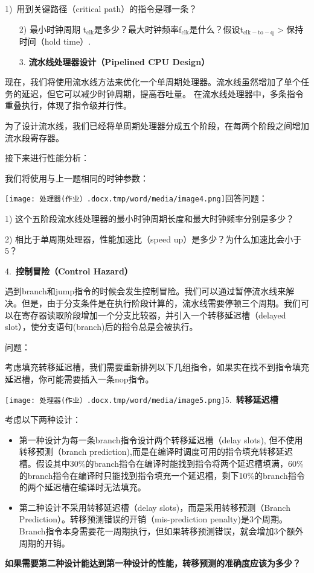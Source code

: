 \documentclass{scrbook}
\begin{document}
1)~\textcolor{color-1}{用到关键路径（critical path）的指令是哪一条？}\label{mark-1)}\begin{enumerate}[1)]
\setcounter{enumi}{1}

\item[2)] \textcolor{color-1}{最小时钟周期 t}$_{\mathrm{clk}}$\textcolor{color-1}{是多少？最大时钟频率f}$_{\mathrm{clk}}$\textcolor{color-1}{是什么？假设t}$_{\mathrm{clk-to-q}}$ \textcolor{color-1}{> 保持时间（hold time）.} 

\item[3.] \textbf{流水线处理器设计（Pipelined CPU Design）} 

\end{enumerate}
现在，我们将使用流水线方法来优化一个单周期处理器。流水线虽然增加了单个任务的延迟，但它可以减少时钟周期，提高吞吐量。 在流水线处理器中，多条指令重叠执行，体现了指令级并行性。

为了设计流水线，我们已经将单周期处理器分成五个阶段，在每两个阶段之间增加流水段寄存器。

接下来进行性能分析：

我们将使用与上一题相同的时钟参数：

\texttt{[image: 处理器(作业）.docx.tmp/word/media/image4.png]}\textcolor{color-1}{回答问题：}

1)	\textcolor{color-1}{这个五阶段流水线处理器的最小时钟周期长度和最大时钟频率分别是多少？}

2)	\textcolor{color-1}{相比于单周期处理器，性能加速比（speed up）是多少？为什么加速比会小于5？}

4.~\textbf{控制冒险（Control Hazard）} \label{mark-4.}

遇到branch和jump指令的时候会发生控制冒险。我们可以通过暂停流水线来解决。但是，由于分支条件是在执行阶段计算的，流水线需要停顿三个周期。我们可以在寄存器读取阶段增加一个分支比较器，并引入一个转移延迟槽（delayed slot），使分支语句(branch)后的指令总是会被执行。

问题：

考虑填充转移延迟槽，我们需要重新排列以下几组指令，如果实在找不到指令填充延迟槽，你可能需要插入一条nop指令。

\texttt{[image: 处理器(作业）.docx.tmp/word/media/image5.png]}5.~\textbf{转移延迟槽}\label{mark-5.}

考虑以下两种设计：
\begin{itemize}
\item 第一种设计为每一条branch指令设计两个转移延迟槽（delay slots), 但不使用转移预测（branch prediction),而是在编译时调度可用的指令填充转移延迟槽。假设其中30\%的branch指令在编译时能找到指令将两个延迟槽填满，60\%的branch指令在编译时只能找到指令填充一个延迟槽，剩下10\%的branch指令的两个延迟槽在编译时无法填充。

\item 第二种设计不采用转移延迟槽（delay slots)，而是采用转移预测（Branch Prediction）。转移预测错误的开销（mis-prediction penalty)是3个周期。Branch指令本身需要花一周期执行，但如果转移预测错误，就会增加3个额外周期的开销。


\end{itemize}
\textbf{\textcolor{color-1}{如果需要第二种设计能达到第一种设计的性能，转移预测的准确度应该为多少？}}
\end{document}
